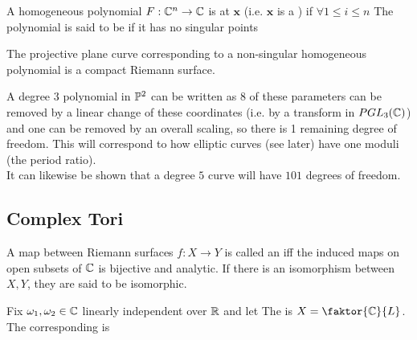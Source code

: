 \documentclass{article}
\begin{document}
\begin{definition}
	A homogeneous polynomial $F:\mathbb{C}^n \to \mathbb{C}$ is  at $\bm{x}$ (i.e. $\bm{x}$ is a ) if $\forall 1 \leq i \leq n$
	The polynomial is said to be  if it has no singular points
\end{definition}

\begin{prop}
	The projective plane curve corresponding to a non-singular homogeneous polynomial is a compact Riemann surface. 
\end{prop}

\begin{remark}
	A degree $3$ polynomial in $\mathbb{P}^2$ can be written as 
$8$ of these parameters can be removed by a linear change of these coordinates (i.e. by a transform in $PGL_3(\mathbb{C})$) and one can be removed by an overall scaling, so there is 1 remaining degree of freedom. This will correspond to how elliptic curves (see later) have one moduli (the period ratio). \\
It can likewise be shown that a degree $5$ curve will have $101$ degrees of freedom. 
\end{remark}

\subsection{Complex Tori}

\begin{definition}
	A map between Riemann surfaces $f:X \to Y$ is called an  iff the induced maps on open subsets of $\mathbb{C}$ is bijective and analytic. If there is an isomorphism between $X,Y$, they are said to be isomorphic.  
\end{definition}

\begin{definition}
	Fix $\omega_1, \omega_2 \in \mathbb{C}$ linearly independent over $\mathbb{R}$ and let 
	The  is $X = \faktor{\mbb{C}}{L}$. The corresponding  is 
	\eq{
		\mf{F} = \mf{F}(X) = \pbrace{\alpha \omega_1+ \beta \omega_2 \, | \, \alpha,\beta \in [0,1)}
	}
\end{definition}
\end{document}
